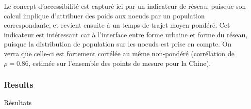 Le concept d'accessibilité est capturé ici par un indicateur de réseau, puisque son calcul implique d'attribuer des poids aux noeuds par un population correspondante, et revient ensuite à un temps de trajet moyen pondéré. Cet indicateur est intéressant car à l'interface entre forme urbaine et forme du réseau, puisque la distribution de population sur les noeuds est prise en compte. On verra que celle-ci est fortement corrélée au même non-pondéré (corrélation de $\rho = 0.86$, estimée sur l'ensemble des points de mesure pour la Chine).








\subsubsection{Results}{Résultats}


